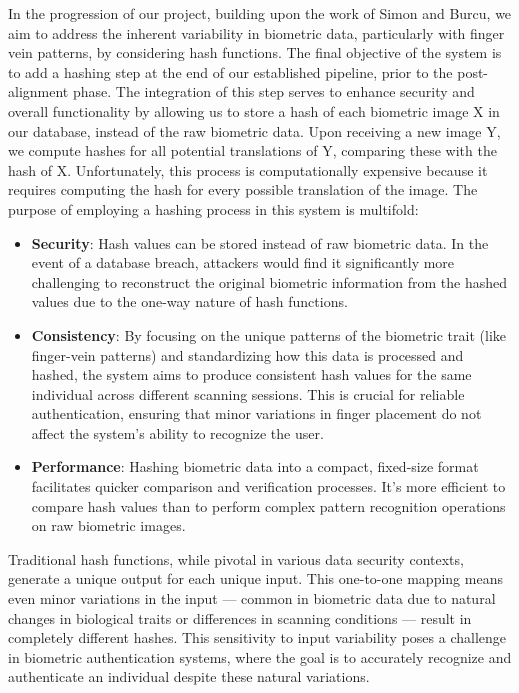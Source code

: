 In the progression of our project, building upon the work of Simon and Burcu, we aim to address the inherent variability in biometric data, particularly with finger vein patterns, by considering hash functions. The final objective of the system is to add a hashing step at the end of our established pipeline, prior to the post-alignment phase. The integration of this step serves to enhance security and overall functionality by allowing us to store a hash of each biometric image X in our database, instead of the raw biometric data. Upon receiving a new image Y, we compute hashes for all potential translations of Y, comparing these with the hash of X. Unfortunately, this process is computationally expensive because it requires computing the hash for every possible translation of the image. The purpose of employing a hashing process in this system is multifold:

\begin{itemize}
    \item \textbf{Security}: Hash values can be stored instead of raw biometric data. In the event of a database breach, attackers would find it significantly more challenging to reconstruct the original biometric information from the hashed values due to the one-way nature of hash functions.

    \item \textbf{Consistency}: By focusing on the unique patterns of the biometric trait (like finger-vein patterns) and standardizing how this data is processed and hashed, the system aims to produce consistent hash values for the same individual across different scanning sessions. This is crucial for reliable authentication, ensuring that minor variations in finger placement do not affect the system's ability to recognize the user.

    \item \textbf{Performance}: Hashing biometric data into a compact, fixed-size format facilitates quicker comparison and verification processes. It's more efficient to compare hash values than to perform complex pattern recognition operations on raw biometric images.
\end{itemize}

Traditional hash functions, while pivotal in various data security contexts, generate a unique output for each unique input. This one-to-one mapping means even minor variations in the input — common in biometric data due to natural changes in biological traits or differences in scanning conditions — result in completely different hashes. This sensitivity to input variability poses a challenge in biometric authentication systems, where the goal is to accurately recognize and authenticate an individual despite these natural variations.

